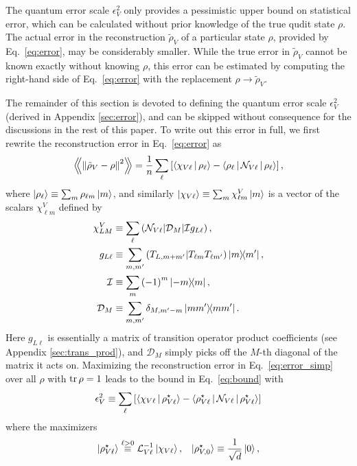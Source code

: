 \documentclass[notitlepage,twocolumn]{revtex4-2}
\newcommand{\f}[2]{\dfrac{#1}{#2}} %
\newcommand{\p}[1]{\left(#1\right)} %
\renewcommand{\sp}[1]{\left[#1\right]} %
\newcommand{\bk}{\Braket} %
\newcommand{\Bbk}[1]
{\left\langle\!\!\left\langle #1 \right\rangle\!\!\right\rangle}
\newcommand{\D}{\mathcal{D}}
\newcommand{\I}{\mathcal{I}}
\renewcommand{\L}{\mathcal{L}}
\newcommand{\N}{\mathcal{N}}
\def\obk#1{\mathinner{({#1})}}
\newcommand{\1}{\mathds{1}}
\begin{document}
The quantum error scale $\epsilon_V^2$ only provides a pessimistic upper bound on statistical error, which can be calculated without prior knowledge of the true qudit state $\rho$.
The actual error in the reconstruction $\tilde\rho_V$ of a particular state $\rho$, provided by Eq.~\eqref{eq:error}, may be considerably smaller.
While the true error in $\tilde\rho_V$ cannot be known exactly without knowing $\rho$, this error can be estimated by computing the right-hand side of Eq.~\eqref{eq:error} with the replacement $\rho\to\tilde\rho_V$.

The remainder of this section is devoted to defining the quantum error scale $\epsilon_V^2$ (derived in Appendix \ref{sec:error}), and can be skipped without consequence for the discussions in the rest of this paper.
To write out this error in full, we first rewrite the reconstruction error in Eq.~\eqref{eq:error} as
\begin{align}
  \Bbk{\norm{\tilde\rho_V-\rho}^2}
  = \f1n \sum_\ell \sp{\bk{\chi_{V\ell}|\rho_\ell}
    - \bk{\rho_\ell|\N_{V\ell}|\rho_\ell}},
  \label{eq:error_simp}
\end{align}
where $\ket{\rho_\ell}\equiv\sum_m \rho_{\ell m}\ket{m}$, and similarly $\ket{\chi_{V\ell}}\equiv\sum_m \chi^V_{\ell m} \ket{m}$ is a vector of the scalars $\chi^V_{\ell m}$ defined by
\begin{align}
  \chi^V_{LM} &\equiv
  \sum_\ell \obk{\N_{V\ell}|\D_M|\I g_{L\ell}}, \\
  g_{L\ell} &\equiv \sum_{m,m'}
  \obk{T_{L,m+m'}|T_{\ell m}T_{\ell m'}} \op{m}{m'}, \\
  \I &\equiv \sum_m \p{-1}^m \op{-m}{m}, \\
  \D_M &\equiv \sum_{m,m'} \delta_{M,m'-m} \op{mm'}.
\end{align}
Here $g_{L\ell}$ is essentially a matrix of transition operator product coefficients (see Appendix \ref{sec:trans_prod}), and $\D_M$ simply picks off the $M$-th diagonal of the matrix it acts on.
Maximizing the reconstruction error in Eq.~\eqref{eq:error_simp} over all $\rho$ with $\tr\rho=1$ leads to the bound in Eq.~\eqref{eq:bound} with
\begin{align}
  \epsilon_V^2 \equiv \sum_\ell\sp{\bk{\chi_{V\ell}|\rho_{V\ell}^\star}
    - \bk{\rho_{V\ell}^\star|\N_{V\ell}|\rho_{V\ell}^\star}}
\end{align}
where the maximizers
\begin{align}
  \ket{\rho_{V\ell}^\star} \stackrel{\ell>0}{\equiv}
  \L_{V\ell}^{-1} \ket{\chi_{V\ell}},
  &&
  \ket{\rho_{V,0}^\star} \equiv \f1{\sqrt{d}} \ket{0},
\end{align}
\end{document}
